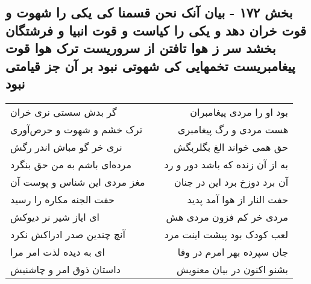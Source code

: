 \begin{center}
\section*{بخش ۱۷۲ - بیان آنک نحن قسمنا کی یکی را شهوت و قوت خران دهد و یکی را کیاست و قوت انبیا و فرشتگان بخشد سر ز هوا تافتن از سروریست ترک هوا قوت پیغامبریست تخمهایی کی شهوتی نبود بر آن جز قیامتی نبود}
\label{sec:sh172}
\begin{longtable}{l p{0.5cm} r}
گر بدش سستی نری خران
&&
بود او را مردی پیغامبران
\\
ترک خشم و شهوت و حرص‌آوری
&&
هست مردی و رگ پیغامبری
\\
نری خر گو مباش اندر رگش
&&
حق همی خواند الغ بگلربگش
\\
مرده‌ای باشم به من حق بنگرد
&&
به از آن زنده که باشد دور و رد
\\
مغز مردی این شناس و پوست آن
&&
آن برد دوزخ برد این در جنان
\\
حفت الجنه مکاره را رسید
&&
حفت النار از هوا آمد پدید
\\
ای ایاز شیر نر دیوکش
&&
مردی خر کم فزون مردی هش
\\
آنچ چندین صدر ادراکش نکرد
&&
لعب کودک بود پیشت اینت مرد
\\
ای به دیده لذت امر مرا
&&
جان سپرده بهر امرم در وفا
\\
داستان ذوق امر و چاشنیش
&&
بشنو اکنون در بیان معنویش
\\
\end{longtable}
\end{center}
